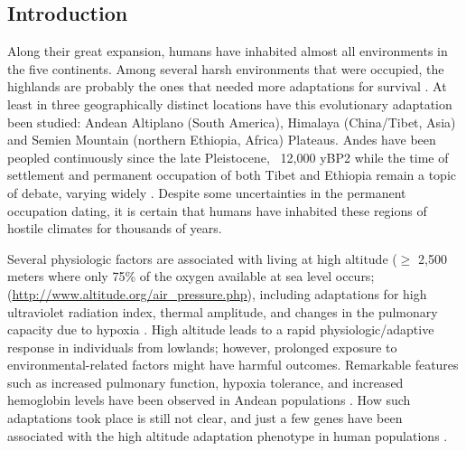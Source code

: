 \newpage
\subsection{Introduction}

Along their great expansion, humans have inhabited almost all environments in the five continents. Among several harsh environments that were occupied, the highlands are probably the ones that needed more adaptations for survival \cite{espinoza-navarro_effects_2011}. At least in three geographically distinct locations have this evolutionary adaptation been studied: Andean Altiplano (South America), Himalaya (China/Tibet, Asia) and Semien Mountain (northern Ethiopia, Africa) Plateaus. Andes have been peopled continuously since the late Pleistocene, ~12,000 yBP2 while the time of settlement and permanent occupation of both Tibet and Ethiopia remain a topic of debate, varying widely \cite{aldenderfer_peopling_2011,lu_ancestral_2016}. Despite some uncertainties in the permanent occupation dating, it is certain that humans have inhabited these regions of hostile climates for thousands of years.

Several physiologic factors are associated with living at high altitude ($\geq$ 2,500 meters where only 75\% of the oxygen available at sea level occurs; (\url{http://www.altitude.org/air\_pressure.php}), including adaptations for high ultraviolet radiation index, thermal amplitude, and changes in the pulmonary capacity due to hypoxia \cite{moore_human_2001,sabeti_genome-wide_2007}. High altitude leads to a rapid physiologic/adaptive response in individuals from lowlands; however, prolonged exposure to environmental-related factors might have harmful outcomes. Remarkable features such as increased pulmonary function, hypoxia tolerance, and increased hemoglobin levels have been observed in Andean populations \cite{bigham_human_2014}. How such adaptations took place is still not clear, and just a few genes have been associated with the high altitude adaptation phenotype in human populations \cite{scheinfeldt_genetic_2012,huerta-sanchez_genetic_2013,simonson_adaptive_2015,valverde_novel_2015,fehren-schmitz_ancient_2016,crawford_natural_2017}.

